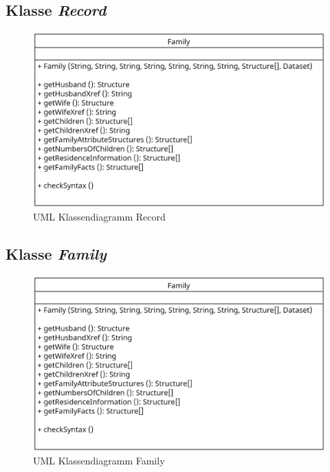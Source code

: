 \subsection{Klasse \textit{Record}}
\label{subsec: Implementierung - Gedcom Struktur - Klasse Record}
\begin{figure}[h]
	\centering
	\includegraphics[width=1\textwidth]{images/UML_Class_Record.png}
	\caption{UML Klassendiagramm Record}
	\label{fig: UML Klassendiagramm Record}
\end{figure}

\subsection{Klasse \textit{Family}}
\label{subsec: Implementierung - Gedcom Struktur - Klasse Family}
\begin{figure}[h]
	\centering
	\includegraphics[width=1\textwidth]{images/UML_Class_Family.png}
	\caption{UML Klassendiagramm Family}
	\label{fig: UML Klassendiagramm Family}
\end{figure}

